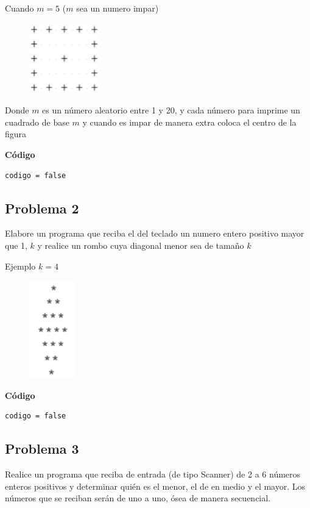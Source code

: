 \documentclass[12pt]{article}
\begin{document}
    Cuando $m = 5$ ($m$ sea un numero impar)
    \begin{figure}[h]
        \includegraphics[width=3cm]{Cuadrado2.png}
    \end{figure}

    Donde $m$ es un número aleatorio entre 1 y 20, y cada número para imprime un cuadrado de base $m$ y cuando es impar de manera extra coloca el centro de la figura

    \hfil \break
    \textbf{Código}
    \begin{lstlisting}
codigo = false
    \end{lstlisting}

    \subsection*{Problema 2}
    Elabore un programa que reciba el del teclado un numero entero positivo mayor que 1, $k$ y realice un rombo cuya diagonal menor sea de tamaño $k$

    Ejemplo $k = 4$
    \begin{figure}[h]
        \includegraphics[width=2cm]{Rombo.png}
    \end{figure}

    \hfil \break
    \textbf{Código}
    \begin{lstlisting}
codigo = false
    \end{lstlisting}

    \subsection*{Problema 3}
    Realice un programa que reciba de entrada (de tipo Scanner) de 2 a 6 números enteros positivos y determinar quién es el menor, el de en medio y el mayor. Los números que se reciban serán de uno a uno, ósea de manera secuencial.
\end{document}
